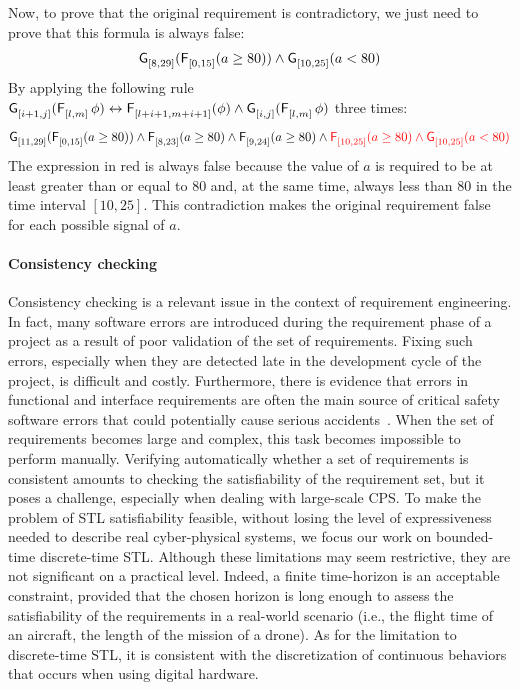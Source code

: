 \documentclass[acmsmall,screen]{acmart}
\begin{document}

Now, to prove that the original requirement is contradictory, we just need to prove that this formula is always false:
\[\mathop{\mathsf{\mathsf{G}}^{{}}_{[8,29]}}(\mathop{\mathsf{\mathsf{F}}^{{}}_{[0,15]}}(a \geq 80)) \wedge \mathop{\mathsf{\mathsf{G}}^{{}}_{[10,25]}}(a < 80)\]
By applying the following rule $\mathop{\mathsf{\mathsf{G}}^{{}}_{[i+1,j]}} (\mathop{\mathsf{\mathsf{F}}^{{}}_{[l,m]}} \phi) \leftrightarrow \mathop{\mathsf{\mathsf{F}}^{{}}_{[l+i+1,m+i+1]}} (\phi) \wedge \mathop{\mathsf{\mathsf{G}}^{{}}_{[i,j]}}(\mathop{\mathsf{\mathsf{F}}^{{}}_{[l,m]}} \phi)   $  three times:
\[\mathop{\mathsf{\mathsf{G}}^{{}}_{[11,29]}}(\mathop{\mathsf{\mathsf{F}}^{{}}_{[0,15]}}(a \geq 80)) \wedge \mathop{\mathsf{\mathsf{F}}^{{}}_{[8,23]}}(a \geq 80) \wedge \mathop{\mathsf{\mathsf{F}}^{{}}_{[9,24]}}(a \geq 80) \wedge \textcolor{red}{\mathop{\mathsf{\mathsf{F}}^{{}}_{[10,25]}}(a \geq 80) \wedge \mathop{\mathsf{\mathsf{G}}^{{}}_{[10,25]}}(a < 80)}\]
The expression in red is always false because the value of $a$ is required to be at least greater than or equal to 80 and, at the same time, always less than 80 in the time interval $[10,25]$.
This contradiction makes the original requirement false for each possible signal of $a$.


\paragraph{Consistency checking}
Consistency checking is a relevant issue in the context of requirement engineering. In fact, many software errors are introduced during the requirement phase of a project as a result of poor validation of the set of requirements.  Fixing such errors, especially when they are detected late in the development cycle of the project, is difficult and costly. Furthermore, there is evidence that errors in functional and interface requirements are often the main source of critical safety software errors that could potentially cause serious accidents~\cite{Heitmeyer96}. 
When the set of requirements becomes large and complex, this task becomes impossible to perform manually.  Verifying automatically whether a set of requirements is consistent amounts to checking the satisfiability of the requirement set, but it poses a challenge, especially when dealing with large-scale CPS.
To make the problem of STL satisfiability feasible, without losing the level of expressiveness needed to describe real cyber-physical systems, we focus our
work on bounded-time discrete-time STL. Although these limitations may seem restrictive, they  are not significant on a practical level.  Indeed, a finite time-horizon is an acceptable constraint, provided that the chosen horizon is long enough to assess the satisfiability of the requirements in a real-world scenario (i.e., the flight time of an aircraft, the length of the mission of a drone). As for the limitation to discrete-time STL, it is consistent with the discretization of continuous behaviors that occurs when using digital hardware.
\end{document}
